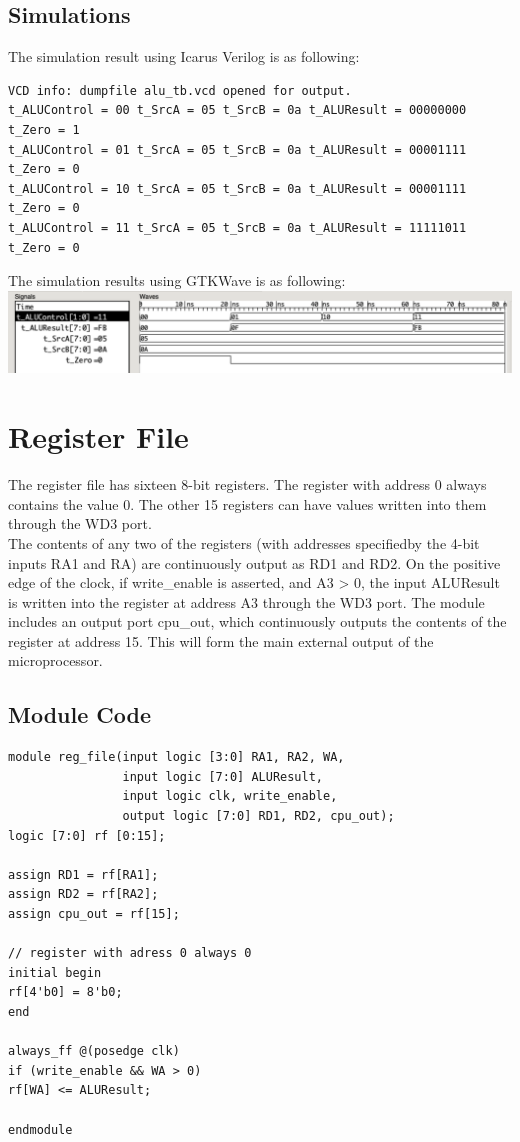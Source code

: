\documentclass{article}
\begin{document}
\subsection{Simulations}
The simulation result using Icarus Verilog is as following:
\begin{Verbatim}
VCD info: dumpfile alu_tb.vcd opened for output.
t_ALUControl = 00 t_SrcA = 05 t_SrcB = 0a t_ALUResult = 00000000 t_Zero = 1
t_ALUControl = 01 t_SrcA = 05 t_SrcB = 0a t_ALUResult = 00001111 t_Zero = 0
t_ALUControl = 10 t_SrcA = 05 t_SrcB = 0a t_ALUResult = 00001111 t_Zero = 0
t_ALUControl = 11 t_SrcA = 05 t_SrcB = 0a t_ALUResult = 11111011 t_Zero = 0
\end{Verbatim}
The simulation results using GTKWave is as following:\vspace{5pt}\\
\includegraphics[width=\textwidth]{alu.png}

\newpage
\section{Register File}
The register file has sixteen 8-bit registers. The register with address 0 always contains the value 0. The other 15 registers can have values written into them through the WD3 port.\\
The contents of any two of the registers (with addresses specifiedby the 4-bit inputs RA1 and RA) are continuously output as RD1 and RD2. On the positive edge of the clock, if write\_enable is asserted, and A3 > 0, the input ALUResult is written into the register at address A3 through the WD3 port. The module includes an output port cpu\_out, which continuously outputs the contents of the register at address 15. This will form the main external output of the microprocessor.
\subsection{Module Code}
\begin{lstlisting}
module reg_file(input logic [3:0] RA1, RA2, WA, 
                input logic [7:0] ALUResult,
                input logic clk, write_enable,
                output logic [7:0] RD1, RD2, cpu_out); 
logic [7:0] rf [0:15];

assign RD1 = rf[RA1]; 
assign RD2 = rf[RA2]; 
assign cpu_out = rf[15];

// register with adress 0 always 0
initial begin
rf[4'b0] = 8'b0;
end

always_ff @(posedge clk) 
if (write_enable && WA > 0) 
rf[WA] <= ALUResult;

endmodule 
\end{lstlisting}
\end{document}
